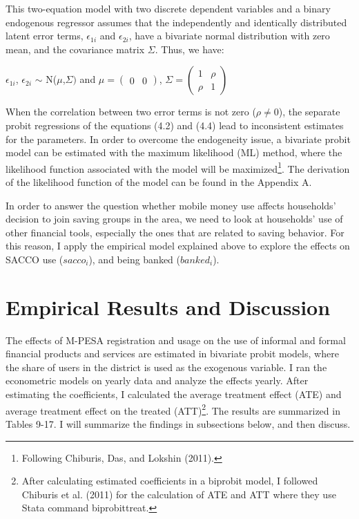 \documentclass[11pt]{article}
\numberwithin{equation}{section}
\begin{document}
This two-equation model with two discrete dependent variables and a binary endogenous regressor assumes that the independently and identically distributed latent error terms, $\epsilon_{1i}$ and $\epsilon_{2i}$, have a bivariate normal distribution with zero mean, and the covariance matrix $\Sigma$. Thus, we have:
\begin{center}
$\epsilon_{1i}$, ${\epsilon_{2i}}$  $\sim$ N($\mu$,$\Sigma)$ and $\mu= \left( \begin{matrix} 0&0\end{matrix} \right)$, $\Sigma= \left( \begin{matrix} 1&\rho\\ \rho&1\end{matrix} \right)$
\end{center}
\par

When the correlation between two error terms is not zero ($\rho\neq$0), the separate probit regressions of the equations (4.2) and (4.4) lead to inconsistent estimates for the parameters. In order to overcome the endogeneity issue, a bivariate probit model can be estimated with the maximum likelihood (ML) method, where the likelihood function associated with the model will be maximized\footnote{Following Chiburis, Das, and Lokshin (2011).}. The derivation of the likelihood function of the model can be found in the Appendix A.

In order to answer the question whether mobile money use affects households' decision to join saving groups in the area, we need to look at households' use of other financial tools, especially the ones that are related to saving behavior. For this reason, I apply the empirical model explained above to explore the effects on SACCO use ($sacco_i$), and being banked ($banked_i$).


\section{Empirical Results and Discussion}

The effects of M-PESA registration and usage on the use of informal and formal financial products and services are estimated in bivariate probit models, where the share of users in the district is used as the exogenous variable. I ran the econometric models on yearly data and analyze the effects yearly. After estimating the coefficients, I calculated the average treatment effect (ATE) and average treatment effect on the treated (ATT)\footnote{After calculating estimated coefficients in a biprobit model, I followed Chiburis et al. (2011) for the calculation of ATE and ATT where they use Stata command biprobittreat.}. The results are summarized in Tables 9-17. I will summarize the findings in subsections below, and then discuss.
\end{document}
